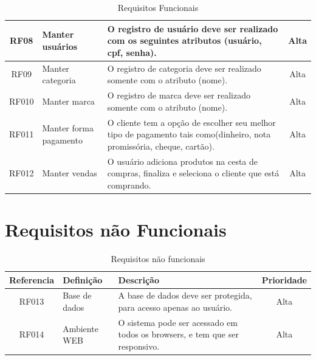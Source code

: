 \documentclass[chapter=TITLE,12pt,oneside,a4paper,english,french,sumario=tradicional,spanish,brazil,]{abntex2}
\begin{document}
\begin{table}[!htpb]
\begin{center}
\begin{tabularx}{\textwidth}{|c|p{3cm}|X|c|}
        \hline
        RF08 &
        Manter usuários &
        O registro de usuário deve ser realizado com os seguintes atributos (usuário, cpf, senha).&
        Alta \\

        \hline
        RF09 &
        Manter categoria &
        O registro de categoria deve ser realizado somente com o atributo (nome).&
        Alta \\

        \hline
        RF010 &
        Manter marca &
        O registro de marca deve ser realizado somente com o atributo (nome).&
        Alta \\

        \hline
        RF011 &
        Manter forma pagamento &
        O cliente tem a opção de escolher seu melhor tipo de pagamento tais como(dinheiro, nota promissória, cheque, cartão).&
        Alta \\

         \hline
        RF012 &
        Manter vendas &
        O usuário adiciona produtos na cesta de compras, finaliza e seleciona o cliente que está comprando.&
        Alta \\
        \hline
        \end{tabularx}\caption{Requisitos Funcionais}\label{}
    \end{center}
\end{table}

\newpage

\section{Requisitos não Funcionais}
\renewcommand\tabularxcolumn[1]{m{#1}}
\begin{table}[!htpb]
    \begin{center}
        \begin{tabularx}{\textwidth}{|c|p{3cm}|X|c|}
        \rowcolor[gray]{0.9}
        \hline
        Referencia &
        Definição &
        Descrição &
        Prioridade \\

         \hline
        RF013 &
        Base de dados &
        A base de dados deve ser protegida, para acesso apenas ao usuário.&
        Alta \\

         \hline
        RF014 &
        Ambiente WEB &
        O sistema pode ser acessado em todos os browsers, e tem que ser responsivo.&
        Alta \\

        \hline
        \end{tabularx}\caption{Requisitos não funcionais}\label{}
    \end{center}
\end{table}
\end{document}

